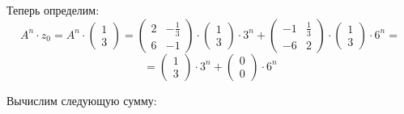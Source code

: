 Теперь определим:
\begin{displaymath}
A^n \cdot z_0 = A^n \cdot \begin{pmatrix}
1
\\
3
\end{pmatrix} = \begin{pmatrix}
2 & - \frac{1}{3}
\\
6 & -1
\end{pmatrix} \cdot \begin{pmatrix}
1
\\
3
\end{pmatrix} \cdot 3^n + \begin{pmatrix}
-1 & \frac{1}{3}
\\
-6 & 2
\end{pmatrix} \cdot \begin{pmatrix}
1
\\
3
\end{pmatrix} \cdot 6^n = 
\end{displaymath} 
\begin{displaymath}
= \begin{pmatrix}
1
\\
3
\end{pmatrix} \cdot 3^n +
\begin{pmatrix}
0
\\
0
\end{pmatrix} \cdot 6^n
\end{displaymath}

Вычислим следующую сумму:

